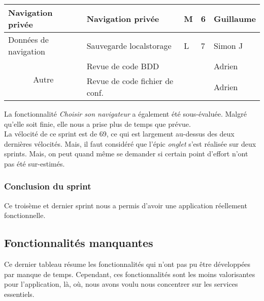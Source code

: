 \documentclass[10pt,a4paper]{article}
\begin{document}
\begin{table}[h]
\begin{tabular}{|c|l|l|l|l|}
\multicolumn{1}{|l|}{Navigation privée}     & Navigation privée                                                                           & M                                            & 6                                           & Guillaume          \\ \hline
\multicolumn{1}{|l|}{Données de navigation} & Sauvegarde localstorage                                                                     & L                                            & 7                                           & Simon J            \\ \hline
\multirow{2}{*}{Autre}                      & Revue de code BDD                                                                           &                                              &                                             & Adrien             \\ \cline{2-5} 
                                            & Revue de code fichier de conf.                                                              &                                              &                                             & Adrien             \\ \hline
\end{tabular}
\end{table}

La fonctionnalité \textit{Choisir son navigateur} a également été sous-évaluée. Malgré qu'elle soit finie, elle nous a prise plus de temps que prévue. \\

La vélocité de ce sprint est de 69, ce qui est largement au-dessus des deux dernières vélocités. Mais, il faut considéré que l'épic \textit{onglet} s'est réalisée sur deux sprints. Mais, on peut quand même se demander si certain point d'effort n'ont pas été sur-estimés.

\subsubsection{Conclusion du sprint}
Ce troisème et dernier sprint nous a permis d'avoir une application réellement fonctionnelle.

\subsection{Fonctionnalités manquantes}
Ce dernier tableau résume les fonctionnalités qui n'ont pas pu être développées par manque de temps. Cependant, ces fonctionnalités sont les moins valorisantes pour l'application, là, où, nous avons voulu nous concentrer sur les services essentiels.
\end{document}
